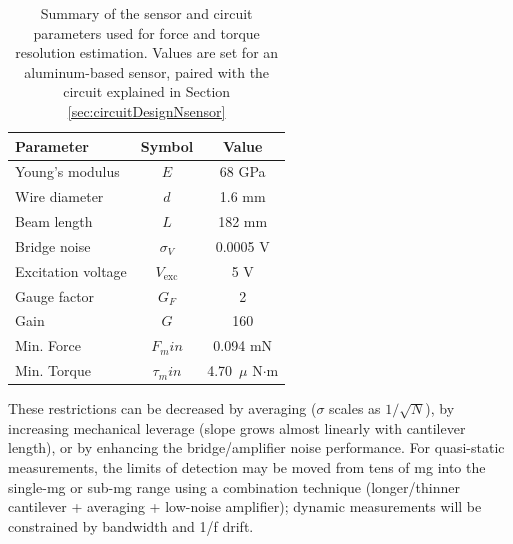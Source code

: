 \begin{table}[hbt!]
	\centering
	\caption[Summary of the sensor and circuit parameters used for force and torque resolution estimation.]{Summary of the sensor and circuit parameters used for force and torque resolution estimation. Values are set for an aluminum-based sensor, paired with the circuit explained in Section \ref{sec:circuitDesignNsensor}}
	\label{tab:sensor_params}
	\begin{tabular}{|l|c|c|}
		\hline
		Parameter & Symbol & Value \\
		\hline
		Young's modulus & $E$ & 68 GPa \\
		Wire diameter & $d$ & 1.6 mm \\
		Beam length & $L$ & 182 mm \\
		\hline
		Bridge noise & $\sigma_V$ & 0.0005 V \\
		Excitation voltage & $V_{\text{exc}}$ & 5 V \\
		Gauge factor & $G_F$ & 2 \\
		Gain & $G$ & 160 \\
		\hline \hline
		Min. Force & $F_min$ & 0.094 mN \\
		Min. Torque & $\tau_min$ & 4.70~$\mu$ N$\cdot$m  \\
		\hline
	\end{tabular}
\end{table}

These restrictions can be decreased by averaging ($\sigma$ scales as $1/\sqrt{N}$), by increasing mechanical leverage (slope grows almost linearly with cantilever length), or by enhancing the bridge/amplifier noise performance. For quasi-static measurements, the limits of detection may be moved from tens of mg into the single-mg or sub-mg range using a combination technique (longer/thinner cantilever + averaging + low-noise amplifier); dynamic measurements will be constrained by bandwidth and 1/f drift.